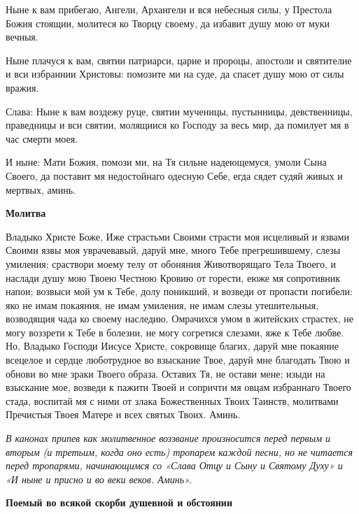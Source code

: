 Ныне к вам прибегаю, Ангели, Архангели и вся небесныя силы, у Престола Божия стоящии, молитеся ко Творцу своему, да избавит душу мою от муки вечныя.


Ныне плачуся к вам, святии патриарси, царие и пророцы, апостоли и святителие и вси избраннии Христовы: помозите ми на суде, да спасет душу мою от силы вражия.


Слава: Ныне к вам воздежу руце, святии мученицы, пустынницы, девственницы, праведницы и вси святии, молящиися ко Господу за весь мир, да помилует мя в час смерти моея.


И ныне: Мати Божия, помози ми, на Тя сильне надеющемуся, умоли Сына Своего, да поставит мя недостойнаго одесную Себе, егда сядет судяй живых и мертвых, аминь.


\medskip
\bfseries Молитва\normalfont{}\nopagebreak


Владыко Христе Боже, Иже страстьми Своими страсти моя исцеливый и язвами Своими язвы моя уврачевавый, даруй мне, много Тебе прегрешившему, слезы умиления; сраствори моему телу от обоняния Животворящаго Тела Твоего, и наслади душу мою Твоею Честною Кровию от горести, еюже мя сопротивник напои; возвыси мой ум к Тебе, долу поникший, и возведи от пропасти погибели: яко не имам покаяния, не имам умиления, не имам слезы утешительныя, возводящия чада ко своему наследию. Омрачихся умом в житейских страстех, не могу воззрети к Тебе в болезни, не могу согретися слезами, яже к Тебе любве. Но, Владыко Господи Иисусе Христе, сокровище благих, даруй мне покаяние всецелое и сердце люботрудное во взыскание Твое, даруй мне благодать Твою и обнови во мне зраки Твоего образа. Оставих Тя, не остави мене; изыди на взыскание мое, возведи к пажити Твоей и сопричти мя овцам избраннаго Твоего стада, воспитай мя с ними от злака Божественных Твоих Таинств, молитвами Пречистыя Твоея Матере и всех святых Твоих. Аминь.



\itshape В канонах припев как молитвенное воззвание произносится перед первым и вторым (и третьим, когда оно есть) тропарем каждой песни, но не читается перед тропарями, начинающимся со «Слава Отцу и Сыну и Святому Духу» и «И ныне и присно и во веки веков. Аминь». \normalfont{}

\longpage{}\mychapterending

 
\bfseries Поемый во всякой скорби душевной и обстоянии


